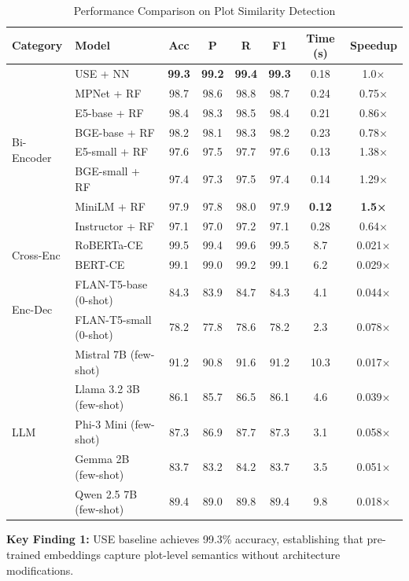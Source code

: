 \documentclass[11pt]{article}
\begin{document}
\begin{table}[h]
\centering
\small
\caption{Performance Comparison on Plot Similarity Detection}
\label{tab:main_results}
\begin{tabular}{llcccccc}
\toprule
\textbf{Category} & \textbf{Model} & \textbf{Acc} & \textbf{P} & \textbf{R} & \textbf{F1} & \textbf{Time (s)} & \textbf{Speedup} \\
\midrule
\multirow{8}{*}{Bi-Encoder}
  & USE + NN & \textbf{99.3} & \textbf{99.2} & \textbf{99.4} & \textbf{99.3} & 0.18 & 1.0× \\
  & MPNet + RF & 98.7 & 98.6 & 98.8 & 98.7 & 0.24 & 0.75× \\
  & E5-base + RF & 98.4 & 98.3 & 98.5 & 98.4 & 0.21 & 0.86× \\
  & BGE-base + RF & 98.2 & 98.1 & 98.3 & 98.2 & 0.23 & 0.78× \\
  & E5-small + RF & 97.6 & 97.5 & 97.7 & 97.6 & 0.13 & 1.38× \\
  & BGE-small + RF & 97.4 & 97.3 & 97.5 & 97.4 & 0.14 & 1.29× \\
  & MiniLM + RF & 97.9 & 97.8 & 98.0 & 97.9 & \textbf{0.12} & \textbf{1.5×} \\
  & Instructor + RF & 97.1 & 97.0 & 97.2 & 97.1 & 0.28 & 0.64× \\
\midrule
\multirow{2}{*}{Cross-Enc}
  & RoBERTa-CE & 99.5 & 99.4 & 99.6 & 99.5 & 8.7 & 0.021× \\
  & BERT-CE & 99.1 & 99.0 & 99.2 & 99.1 & 6.2 & 0.029× \\
\midrule
\multirow{2}{*}{Enc-Dec}
  & FLAN-T5-base (0-shot) & 84.3 & 83.9 & 84.7 & 84.3 & 4.1 & 0.044× \\
  & FLAN-T5-small (0-shot) & 78.2 & 77.8 & 78.6 & 78.2 & 2.3 & 0.078× \\
\midrule
\multirow{5}{*}{LLM}
  & Mistral 7B (few-shot) & 91.2 & 90.8 & 91.6 & 91.2 & 10.3 & 0.017× \\
  & Llama 3.2 3B (few-shot) & 86.1 & 85.7 & 86.5 & 86.1 & 4.6 & 0.039× \\
  & Phi-3 Mini (few-shot) & 87.3 & 86.9 & 87.7 & 87.3 & 3.1 & 0.058× \\
  & Gemma 2B (few-shot) & 83.7 & 83.2 & 84.2 & 83.7 & 3.5 & 0.051× \\
  & Qwen 2.5 7B (few-shot) & 89.4 & 89.0 & 89.8 & 89.4 & 9.8 & 0.018× \\
\bottomrule
\end{tabular}
\end{table}

\textbf{Key Finding 1:} USE baseline achieves 99.3\% accuracy, establishing that pre-trained embeddings capture plot-level semantics without architecture modifications.
\end{document}

